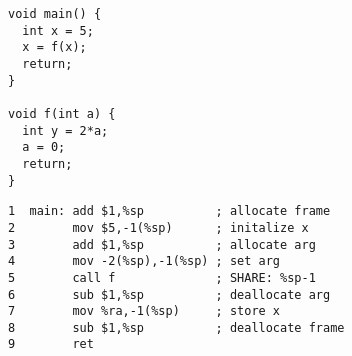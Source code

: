 \documentclass[acmsmall,review,anonymous]{acmart}\settopmatter{printfolios=true,printccs=false,printacmref=false}
\begin{document}
\begin{figure}
  \centering
  \begin{subfigure}{.2\textwidth}
{\small
\begin{verbatim}
void main() {
  int x = 5;
  x = f(x);
  return;
}

void f(int a) {
  int y = 2*a;
  a = 0;
  return;
}
\end{verbatim}
}
  \end{subfigure}
  \begin{subfigure}{.6\textwidth}
{\small
\begin{verbatim}
1  main: add $1,%sp          ; allocate frame
2        mov $5,-1(%sp)      ; initalize x
3        add $1,%sp          ; allocate arg
4        mov -2(%sp),-1(%sp) ; set arg
5        call f              ; SHARE: %sp-1
6        sub $1,%sp          ; deallocate arg
7        mov %ra,-1(%sp)     ; store x
8        sub $1,%sp          ; deallocate frame
9        ret


\end{verbatim}}
\end{subfigure}
\end{figure}
\end{document}
